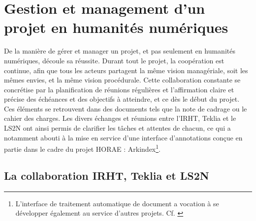 \documentclass[a4paper,12pt,twoside]{book}
\begin{document}
	
	\section{\label{gestion_management}Gestion et management d’un projet en humanités numériques}
	
	De la manière de gérer et manager un projet, et pas seulement en humanités numériques, découle sa réussite. Durant tout le projet, la coopération est continue, afin que tous les acteurs partagent la même vision managériale, soit les mêmes envies, et la même vision procédurale. Cette collaboration constante se concrétise par la planification de réunions régulières et l'affirmation claire et précise des échéances et des objectifs à atteindre, et ce dès le début du projet. Ces éléments se retrouvent dans des documents tels que la note de cadrage ou le cahier des charges. Les divers échanges et réunions entre l'IRHT, Teklia et le LS2N ont ainsi permis de clarifier les tâches et attentes de chacun, ce qui a notamment abouti à la mise en service d'une interface d'annotations conçue en partie dans le cadre du projet HORAE : Arkindex\footnote{L'interface de traitement automatique de document a vocation à se développer également au service d'autres projets. Cf. \cite{memoire_Chloe}}. 
	
	\subsection{La collaboration IRHT, Teklia et LS2N}
	
\end{document}
